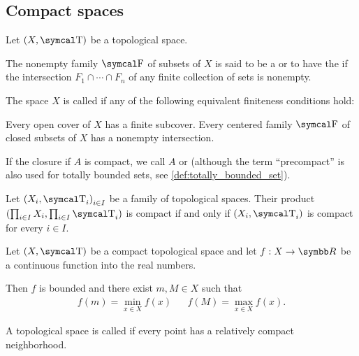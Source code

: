 \subsection{Compact spaces}\label{subsec:compact_spaces}

Let \( (X, \T) \) be a topological space.

\begin{definition}\label{def:centered_family}\cite[123]{Engelking1989}
  The nonempty family \( \F \) of subsets of \( X \) is said to be a  or to have the  if the intersection \( F_1 \cap \cdots \cap F_n \) of any finite collection of sets is nonempty.
\end{definition}

\begin{definition}\label{def:compact_space}\cite[123]{Engelking1989}
  The space \( X \) is called  if any of the following equivalent finiteness conditions hold:
  \begin{defenum}
     Every open cover of \( X \) has a finite subcover.
     Every centered family \( \F \) of closed subsets of \( X \) has a nonempty intersection.
  \end{defenum}
\end{definition}

\begin{remark}\label{remark:precompact_set}
  If the closure if \( A \) is compact, we call \( A \)  or  (although the term \enquote{precompact} is also used for totally bounded sets, see \ref{def:totally_bounded_set}).
\end{remark}

\begin{theorem}\label{thm:tychonoffs_product_theorem}\cite[theorem 3.2.4]{Engelking1989}
  Let \( { (X_i, \T_i) }_{i \in I} \) be a family of topological spaces. Their product \( (\prod_{i \in I} X_i, \prod_{i \in I} \T_i) \) is compact if and only if \( (X_i, \T_i) \) is compact for every \( i \in I \).

\end{theorem}

\begin{theorem}\label{thm:weierstrass_extreme_value_theorem}
  Let \( (X, \T) \) be a compact topological space and let \( f: X \to \R \) be a continuous function into the real numbers.

  Then \( f \) is bounded and there exist \( m, M \in X \) such that
  \begin{align*}
    f(m) = \min_{x \in X} f(x)
    &&
    f(M) = \max_{x \in X} f(x).
  \end{align*}
\end{theorem}

\begin{definition}\label{def:locally_compact_space}\cite[148]{Engelking1989}
  A topological space is called  if every point has a relatively compact neighborhood.
\end{definition}
